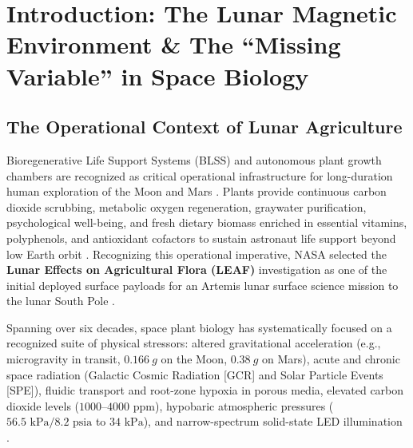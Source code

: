 \documentclass[default,sn-nature,iicol]{sn-jnl}
\begin{document}

\maketitle



\section{Introduction: The Lunar Magnetic Environment \& The ``Missing Variable'' in Space Biology}


\subsection{The Operational Context of Lunar Agriculture}
Bioregenerative Life Support Systems (BLSS) and autonomous plant growth chambers are recognized as critical operational infrastructure for long-duration human exploration of the Moon and Mars \cite{ref1,ref2,ref3}. Plants provide continuous carbon dioxide scrubbing, metabolic oxygen regeneration, graywater purification, psychological well-being, and fresh dietary biomass enriched in essential vitamins, polyphenols, and antioxidant cofactors to sustain astronaut life support beyond low Earth orbit \cite{ref4,ref5}. Recognizing this operational imperative, NASA selected the \textbf{Lunar Effects on Agricultural Flora (LEAF)} investigation as one of the initial deployed surface payloads for an Artemis lunar surface science mission to the lunar South Pole \cite{ref1,ref6}.

Spanning over six decades, space plant biology has systematically focused on a recognized suite of physical stressors: altered gravitational acceleration (e.g., microgravity in transit, $0.166\ g$ on the Moon, $0.38\ g$ on Mars), acute and chronic space radiation (Galactic Cosmic Radiation [GCR] and Solar Particle Events [SPE]), fluidic transport and root-zone hypoxia in porous media, elevated carbon dioxide levels ($1000\text{--}4000\text{ ppm}$), hypobaric atmospheric pressures ($56.5\text{ kPa} / 8.2\text{ psia}$ to $34\text{ kPa}$), and narrow-spectrum solid-state LED illumination \cite{ref7,ref8,ref9}. 
\end{document}
